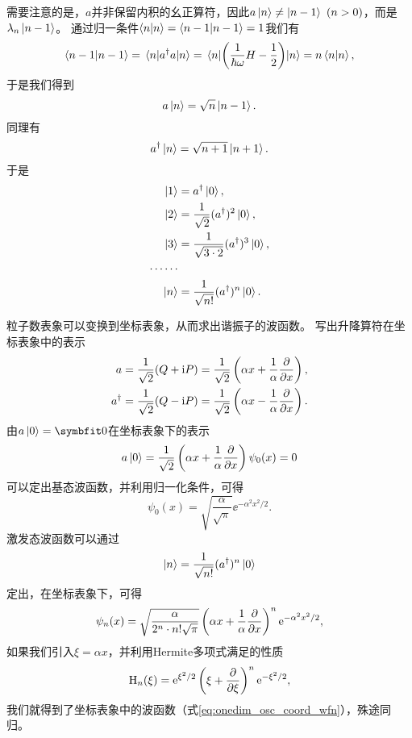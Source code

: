 需要注意的是，$a$并非保留内积的幺正算符，因此$a\ket{n}\neq\ket{n-1}\ (n>0)$，而是$\lambda_n\ket{n-1}$。
通过归一条件$\braket{n}{n}=\braket{n-1}{n-1}=1$我们有
\begin{equation}
    \braket{n-1}{n-1} = \mel{n}{a^\dagger a}{n} = \mel{n}{\left(\frac{1}{\hbar\omega}H-\frac12\right)}{n} = n \braket{n}{n},
\end{equation}
于是我们得到
\begin{equation}
    a\ket{n} = \sqrt{n}\ket{n-1}.
\end{equation}
同理有
\begin{equation}
    a^\dagger \ket{n} = \sqrt{n+1}\ket{n+1}.
\end{equation}
于是
\begin{equation}
\begin{aligned}
    \ket{1} &= a^\dagger \ket{0}, \\
    \ket{2} &= \frac{1}{\sqrt{2}} (a^\dagger)^2 \ket{0}, \\
    \ket{3} &= \frac{1}{\sqrt{3\cdot 2}} (a^\dagger)^3 \ket{0}, \\
    \cdots \cdots \\
    \ket{n} &= \frac{1}{\sqrt{n!}} (a^\dagger)^n \ket{0}.
\end{aligned}
\end{equation}

粒子数表象可以变换到坐标表象，从而求出谐振子的波函数。
写出升降算符在坐标表象中的表示
\begin{equation}
\begin{aligned}
    a       &= \frac{1}{\sqrt{2}}(Q+\mathrm{i} P) = \frac{1}{\sqrt{2}}\left(\alpha x + \frac{1}{\alpha}\frac{\partial}{\partial x} \right), \\
    a^\dagger  &= \frac{1}{\sqrt{2}}(Q-\mathrm{i} P) = \frac{1}{\sqrt{2}}\left(\alpha x - \frac{1}{\alpha}\frac{\partial}{\partial x} \right).
\end{aligned}
\end{equation}
由$a\ket{0}=\bm{0}$在坐标表象下的表示
\begin{equation}
    a\ket{0} = \frac{1}{\sqrt{2}}\left(\alpha x + \frac{1}{\alpha}\frac{\partial}{\partial x} \right) \psi_0(x) = 0
\end{equation}
可以定出基态波函数，并利用归一化条件，可得
\begin{equation}
    \psi_0(x) = \sqrt{\frac{\alpha}{\sqrt{\pi}}} \ee^{-\alpha^2 x^2/2}.
\end{equation}
激发态波函数可以通过
\begin{equation}
    \ket{n} = \frac{1}{\sqrt{n!}} (a^\dagger)^n \ket{0}
\end{equation}
定出，在坐标表象下，可得
\begin{equation}
    \psi_n(x) = \sqrt{\frac{\alpha}{2^n\cdot n! \sqrt{\pi}}} \left( \alpha x + \frac{1}{\alpha}\frac{\partial}{\partial x} \right)^n \mathrm{e}^{-\alpha^2 x^2/2},
\end{equation}
如果我们引入$\xi=\alpha x$，并利用Hermite多项式满足的性质
\begin{equation}
    \mathrm{H}_n(\xi) = \mathrm{e}^{\xi^2/2} \left( \xi + \frac{\partial}{\partial \xi} \right)^n \mathrm{e}^{-\xi^2/2},
\end{equation}
我们就得到了坐标表象中的波函数（式\eqref{eq:onedim_osc_coord_wfn}），殊途同归。
